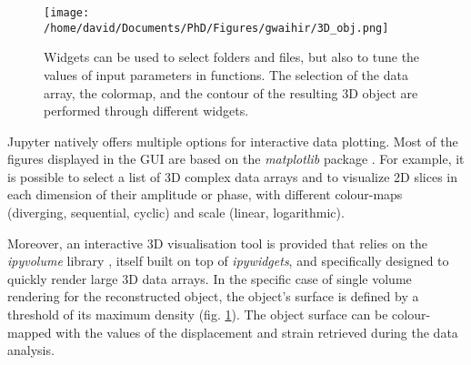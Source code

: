 

\begin{figure}[!htb]
    \centering
    \texttt{[image: /home/david/Documents/PhD/Figures/gwaihir/3D\_obj.png]}
    \caption{
    Widgets can be used to select folders and files, but also to tune the values of input parameters in functions.
    The selection of the data array, the colormap, and the contour of the resulting 3D object are performed through different widgets.
    }
    \label{fig:3D_object}
\end{figure}

Jupyter natively offers multiple options for interactive data plotting.
Most of the figures displayed in the GUI are based on the \textit{matplotlib} package \parencite{hunter2007matplotlib}.
For example, it is possible to select a list of 3D complex data arrays and to visualize 2D slices in each dimension of their amplitude or phase, with different colour-maps (diverging, sequential, cyclic) and scale (linear, logarithmic).

Moreover, an interactive 3D visualisation tool is provided that relies on the \textit{ipyvolume} library \parencite{ipyvolume}, itself built on top of \textit{ipywidgets}, and specifically designed to quickly render large 3D data arrays.
In the specific case of single volume rendering for the reconstructed object, the object's surface is defined by a threshold of its maximum density (fig. \ref{fig:3D_object}).
The object surface can be colour-mapped with the values of the displacement and strain retrieved during the data analysis.

